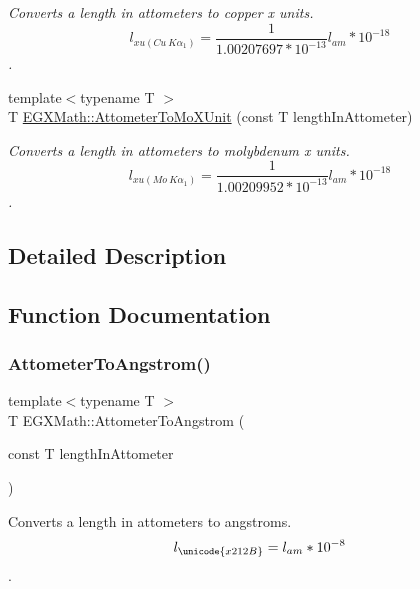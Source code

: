 \begin{DoxyCompactItemize}
\begin{DoxyCompactList}\small\item\em Converts a length in attometers to copper x units. \[ l_{xu(Cu\ K\alpha_1)}= \frac{1}{1.00207697*10^{-13}} l_{am} * 10^{-18} \]. \end{DoxyCompactList}\item 
{\footnotesize template$<$typename T $>$ }\\T \mbox{\hyperlink{group___e_g_x_math-_conversions-_length_conversions-_s_i-_attometer-_non-_s_i_ga79ec6f4ec4a97af05fe8f69b80805ab7}{E\+G\+X\+Math\+::\+Attometer\+To\+Mo\+X\+Unit}} (const T length\+In\+Attometer)
\begin{DoxyCompactList}\small\item\em Converts a length in attometers to molybdenum x units. \[ l_{xu(Mo\ K\alpha_1)}=\frac{1}{1.00209952*10^{-13}} l_{am} * 10^{-18} \]. \end{DoxyCompactList}\end{DoxyCompactItemize}


\subsection{Detailed Description}


\subsection{Function Documentation}
\mbox{\label{group___e_g_x_math-_conversions-_length_conversions-_s_i-_attometer-_non-_s_i_ga331ff6e8159f6f00bb7a20e39fa4d756}} 
\subsubsection{\texorpdfstring{Attometer\+To\+Angstrom()}{AttometerToAngstrom()}}
{\footnotesize\ttfamily template$<$typename T $>$ \\
T E\+G\+X\+Math\+::\+Attometer\+To\+Angstrom (\begin{DoxyParamCaption}\item[{const T}]{length\+In\+Attometer }\end{DoxyParamCaption})}



Converts a length in attometers to angstroms. \[ l_{\unicode{x212B}}=l_{am} * 10^{-8} \]. 

